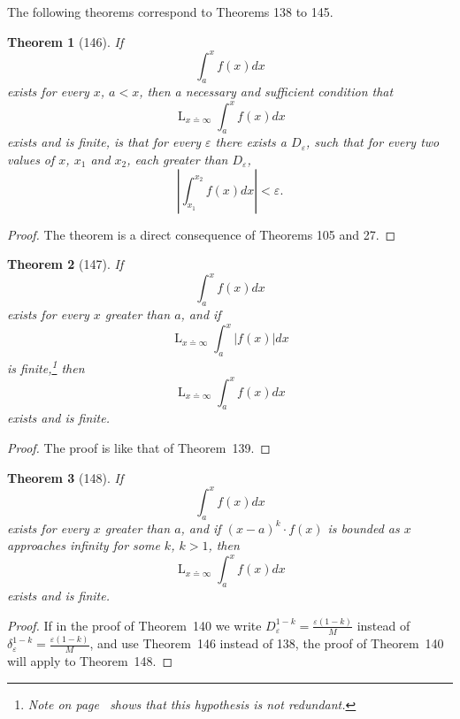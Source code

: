 \documentclass[a4paper,12pt]{book}[2004/02/16]
\providecommand{\colorbox}[2]{#2}
\newcommand{\correction}[2]{\colorbox{corr}{#1}}
\providecommand{\hyperlink}[2]{#2}
\providecommand{\hypertarget}[2]{#2}
\theoremstyle{ilemma}
\theoremstyle{itheorem}
\newtheorem{theorem}{Theorem}
\theoremstyle{iother}
\theoremstyle{icorollary}
\theoremstyle{numcorollary}
\theoremstyle{idefinition}
\renewcommand{\dfrac}[2]{\frac{#1}{#2}}%
\begin{document}
The following theorems correspond to Theorems \hyperlink{thm138}{138} to \hyperlink{thm145}{145}.

\begin{theorem}[146]\hypertarget{thm146}{}
If
\[
  \int_a^xf(x)dx
\]
exists for every $x$, $a<x$, then a necessary and sufficient condition
that
\[
  \mathop{L}_{x\doteq \infty}\int_a^xf(x)dx
\]
exists and is finite, is that for every $\varepsilon$ there exists a
$D_{\varepsilon}$, such that for every two values of $x$, $x_1$ and
$x_2$, each greater than $D_{\varepsilon}$,
\[
  \left|\int_{x_1}^{x_2}f(x)dx\right|<\varepsilon\text{\correction{.}{}}
\]
\end{theorem}

\begin{proof}
The theorem is a direct consequence of Theorems \hyperlink{thm105}{105} and \hyperlink{thm27}{27}.
\end{proof}

\begin{theorem}[147]\hypertarget{thm147}{}
If
\[
  \int_a^xf(x)dx
\]
exists for every $x$ greater than $a$, and if
\[
   \mathop{L}_{x\doteq \infty}\int_a^x|f(x)|dx
\]
is finite,\footnote{%
  Note on page~\pageref{egp192} shows that this hypothesis is not redundant.}
then
\[
  \mathop{L}_{x\doteq \infty}\int_a^xf(x)dx
\]
exists and is finite.
\end{theorem}

\begin{proof}
The proof is like that of Theorem~\hyperlink{thm139}{139}.
\end{proof}

\begin{theorem}[148]\hypertarget{thm148}{}
If
\[
  \int_a^xf(x)dx
\]
exists for every $x$ greater than $a$, and if $(x-a)^k\cdot f(x)$ is
bounded as $x$ approaches infinity for some $k$, $k>1$, then
\[
   \mathop{L}_{x\doteq \infty}\int_a^xf(x)dx
\]
exists and is finite.
\end{theorem}

\begin{proof}
If in the proof of Theorem~\hyperlink{thm140}{140} we write $D_{\varepsilon}^{1-k}=
\dfrac{\varepsilon (1-k)}{M}$ instead of $\delta_{\varepsilon}^{1-k}=\dfrac{\varepsilon (1-k)}{M}$, and use
Theorem~\hyperlink{thm146}{146} instead of 138, the proof of Theorem~\hyperlink{thm140}{140} will apply to
Theorem~\hyperlink{thm148}{148}.
\end{proof}
\end{document}
